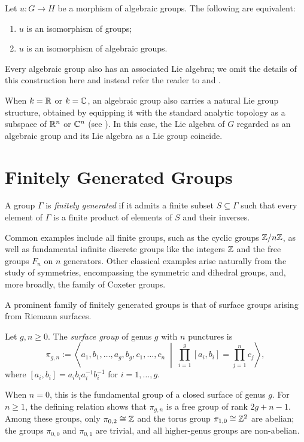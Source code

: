 \begin{proposition}
    Let $u : G \to H$ be a morphism of algebraic groups. The following are equivalent:
    \begin{enumerate}
        \item[(i)] $u$ is an isomorphism of groups;
        \item[(ii)] $u$ is an isomorphism of algebraic groups.
    \end{enumerate}
\end{proposition}

Every algebraic group also has an associated Lie algebra; we omit the details of this construction here and instead refer the reader to \cite[Ch.\ 23]{tauvelLieAlgebrasAlgebraic2005} and \cite[Ch.\ 2]{milneLAG}.

When $k = \mathbb{R}$ or $k = \mathbb{C}$, an algebraic group also carries a natural Lie group structure, obtained by equipping it with the standard analytic topology as a subspace of $\mathbb{R}^n$ or $\mathbb{C}^n$ (see \cite[Ch.\ 3, Thm.\ 2.1]{milneLAG}). In this case, the Lie algebra of $G$ regarded as an algebraic group and its Lie algebra as a Lie group coincide.

\section{Finitely Generated Groups}

\begin{definition}
    A group $\Gamma$ is \emph{finitely generated} if it admits a finite subset $S \subseteq \Gamma$ such that every element of $\Gamma$ is a finite product of elements of $S$ and their inverses.
\end{definition}

Common examples include all finite groups, such as the cyclic groups $\mathbb{Z}/n\mathbb{Z}$, as well as fundamental infinite discrete groups like the integers $\mathbb{Z}$ and the free groups $F_n$ on $n$ generators. Other classical examples arise naturally from the study of symmetries, encompassing the symmetric and dihedral groups, and, more broadly, the family of Coxeter groups.

A prominent family of finitely generated groups is that of surface groups arising from Riemann surfaces.

\begin{definition}
    Let $g, n \geqslant 0$. The \emph{surface group} of genus $g$ with $n$ punctures is
    \[
        \pi_{g,n} := \left\langle a_1, b_1, \dots, a_g, b_g, c_1, \dots, c_n \;\middle|\; \prod_{i=1}^g [a_i, b_i] = \prod_{j=1}^n c_j \right\rangle,
    \]
    where $[a_i, b_i] = a_i b_i a_i^{-1} b_i^{-1}$ for $i = 1, \dots, g$.

    When $n = 0$, this is the fundamental group of a closed surface of genus $g$. For $n \geqslant 1$, the defining relation shows that $\pi_{g,n}$ is a free group of rank $2g + n - 1$. Among these groups, only $\pi_{0,2} \cong \mathbb{Z}$ and the torus group $\pi_{1,0} \cong \mathbb{Z}^2$ are abelian; the groups $\pi_{0,0}$ and $\pi_{0,1}$ are trivial, and all higher-genus groups are non-abelian.
\end{definition}


